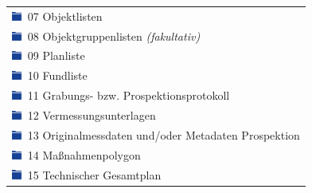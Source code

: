 \begin{center}
\begin{longtable}{l}
		\includegraphics[width=0.4cm]{bilder/OrdnerIconZu.png} \hspace*{0.04cm} 07 Objektlisten\\
		\includegraphics[width=0.4cm]{bilder/OrdnerIconZu.png} \hspace*{0.04cm} 08 Objektgruppenlisten \emph{(fakultativ)}\\
		\includegraphics[width=0.4cm]{bilder/OrdnerIconZu.png} \hspace*{0.04cm} 09 Planliste\\
		\includegraphics[width=0.4cm]{bilder/OrdnerIconZu.png} \hspace*{0.04cm} 10 Fundliste\\
		\includegraphics[width=0.4cm]{bilder/OrdnerIconZu.png} \hspace*{0.04cm} 11 Grabungs- bzw. Prospektionsprotokoll\\
		\includegraphics[width=0.4cm]{bilder/OrdnerIconZu.png} \hspace*{0.04cm} 12 Vermessungsunterlagen\\
		\includegraphics[width=0.4cm]{bilder/OrdnerIconZu.png} \hspace*{0.04cm} 13 Originalmessdaten und/oder Metadaten Prospektion\\
		\includegraphics[width=0.4cm]{bilder/OrdnerIconZu.png} \hspace*{0.04cm} 14 Maßnahmenpolygon\\
		\includegraphics[width=0.4cm]{bilder/OrdnerIconZu.png} \hspace*{0.04cm} 15 Technischer Gesamtplan\\

\end{longtable}
\end{center}
